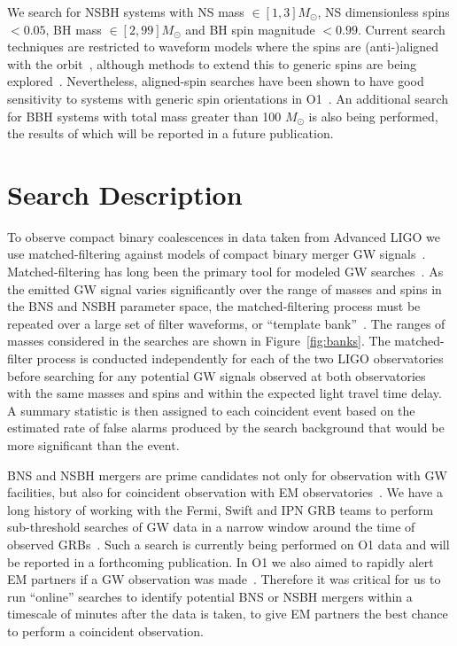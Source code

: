 We search for \ac{NSBH} systems with NS mass
$\in [1,3] M_{\odot}$, NS dimensionless spins $< 0.05$, BH mass $\in [2,99] M_{\odot}$
and BH spin magnitude $< 0.99$. Current search techniques are restricted to
waveform models where the spins are (anti-)aligned with the orbit~\citep{Messick:2016aqy,Usman:2015kfa},
although methods to extend this to generic spins are being explored~\citep{Harry:2016ijz}.
Nevertheless, aligned-spin searches have been shown to have good sensitivity
to systems with generic spin orientations in \ac{O1}~\citep{dal2015impact,Harry:2016ijz}. An
additional search for BBH systems with total mass greater than 100 $M_{\odot}$
is also being performed, the results of which will be reported in a future publication.

\section{Search Description}
\label{sec:search_description}

To observe compact binary coalescences in data taken from Advanced \ac{LIGO} we use
matched-filtering against models of compact binary merger \ac{GW} signals~\citep{Wainstein}.
Matched-filtering has long been the primary tool for modeled \ac{GW} searches~\citep{Abbott:2003pj, Colaboration:2011np}.
As the emitted \ac{GW} signal varies significantly over the range of masses and spins
in the \ac{BNS} and \ac{NSBH} parameter space, the matched-filtering process must be repeated
over a large set of filter waveforms, or ``template bank''~\citep{Owen:1998dk}.
The ranges of masses considered in the searches are shown in Figure~\ref{fig:banks}.
The matched-filter process is conducted independently for each of the two \ac{LIGO} observatories before searching
for any potential \ac{GW} signals observed at both observatories with the
same masses and spins and within the expected light travel time delay.
A summary statistic is then assigned to each coincident event based on the estimated
rate of false alarms produced by the search background that would be more significant than the event.

\ac{BNS} and \ac{NSBH} mergers are prime candidates not only for observation with
\ac{GW} facilities, but also for coincident observation with \ac{EM}
observatories~\citep{Eichler:1989ve, Hansen:2000am, Narayan:1992iy, Li:1998bw, Nakar:2007yr, Metzger:2011bv, Nakar:2011cw, Berger:2013jza, Zhang:2013lta, Fong:2015oha}.
We have a long history of working with the Fermi, Swift and IPN \ac{GRB} teams
to perform sub-threshold searches of \ac{GW} data in a narrow window around
the time of observed \acp{GRB}~\citep{Abbott:2005yy, Abbott:2007rh, Abadie:2012bz, Briggs:2012ce}.
Such a search is currently being performed on \ac{O1} data and will be reported in a forthcoming
publication.
In \ac{O1} we also aimed to rapidly alert \ac{EM}
partners if a \ac{GW} observation was made~\citep{Abbott:2016gcq}.
Therefore it was critical for us to run ``online'' searches
to identify potential \ac{BNS} or \ac{NSBH} mergers within a timescale of minutes after the data
is taken, to give \ac{EM} partners the best chance to perform a coincident
observation.

